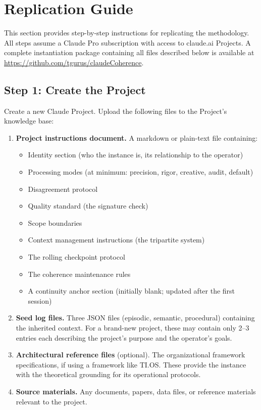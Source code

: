 \documentclass[11pt,a4paper]{article}
\begin{document}
\section{Replication Guide}

This section provides step-by-step instructions for replicating the methodology. All steps assume a Claude Pro subscription with access to claude.ai Projects. A complete instantiation package containing all files described below is available at \url{https://github.com/tgurus/claudeCoherence}.

\subsection{Step 1: Create the Project}

Create a new Claude Project. Upload the following files to the Project's knowledge base:

\begin{enumerate}[leftmargin=2em]
    \item \textbf{Project instructions document.} A markdown or plain-text file containing:
    \begin{itemize}
        \item Identity section (who the instance is, its relationship to the operator)
        \item Processing modes (at minimum: precision, rigor, creative, audit, default)
        \item Disagreement protocol
        \item Quality standard (the signature check)
        \item Scope boundaries
        \item Context management instructions (the tripartite system)
        \item The rolling checkpoint protocol
        \item The coherence maintenance rules
        \item A continuity anchor section (initially blank; updated after the first session)
    \end{itemize}

    \item \textbf{Seed log files.} Three JSON files (episodic, semantic, procedural) containing the inherited context. For a brand-new project, these may contain only 2--3 entries each describing the project's purpose and the operator's goals.

    \item \textbf{Architectural reference files} (optional). The organizational framework specifications, if using a framework like TI.OS. These provide the instance with the theoretical grounding for its operational protocols.

    \item \textbf{Source materials.} Any documents, papers, data files, or reference materials relevant to the project.
\end{enumerate}
\end{document}
